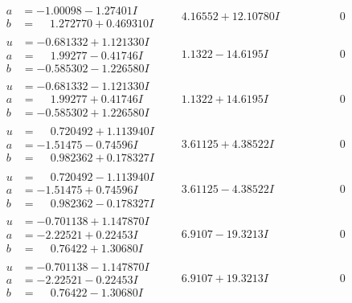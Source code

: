\documentclass[1p]{elsarticle_modified}
\theoremstyle{definition}
\begin{document}
$$\begin{array}{c|c|c}
\begin{aligned}
a &= -1.00098 - 1.27401 I \\
b &= \phantom{-}1.272770 + 0.469310 I\end{aligned}
 & \phantom{-}4.16552 + 12.10780 I & \phantom{-0.000000 } 0 \\ \hline\begin{aligned}
u &= -0.681332 + 1.121330 I \\
a &= \phantom{-}1.99277 - 0.41746 I \\
b &= -0.585302 - 1.226580 I\end{aligned}
 & \phantom{-}1.1322 - 14.6195 I & \phantom{-0.000000 } 0 \\ \hline\begin{aligned}
u &= -0.681332 - 1.121330 I \\
a &= \phantom{-}1.99277 + 0.41746 I \\
b &= -0.585302 + 1.226580 I\end{aligned}
 & \phantom{-}1.1322 + 14.6195 I & \phantom{-0.000000 } 0 \\ \hline\begin{aligned}
u &= \phantom{-}0.720492 + 1.113940 I \\
a &= -1.51475 - 0.74596 I \\
b &= \phantom{-}0.982362 + 0.178327 I\end{aligned}
 & \phantom{-}3.61125 + 4.38522 I & \phantom{-0.000000 } 0 \\ \hline\begin{aligned}
u &= \phantom{-}0.720492 - 1.113940 I \\
a &= -1.51475 + 0.74596 I \\
b &= \phantom{-}0.982362 - 0.178327 I\end{aligned}
 & \phantom{-}3.61125 - 4.38522 I & \phantom{-0.000000 } 0 \\ \hline\begin{aligned}
u &= -0.701138 + 1.147870 I \\
a &= -2.22521 + 0.22453 I \\
b &= \phantom{-}0.76422 + 1.30680 I\end{aligned}
 & \phantom{-}6.9107 - 19.3213 I & \phantom{-0.000000 } 0 \\ \hline\begin{aligned}
u &= -0.701138 - 1.147870 I \\
a &= -2.22521 - 0.22453 I \\
b &= \phantom{-}0.76422 - 1.30680 I\end{aligned}
 & \phantom{-}6.9107 + 19.3213 I & \phantom{-0.000000 } 0\\

\end{array}$$
\end{document}
